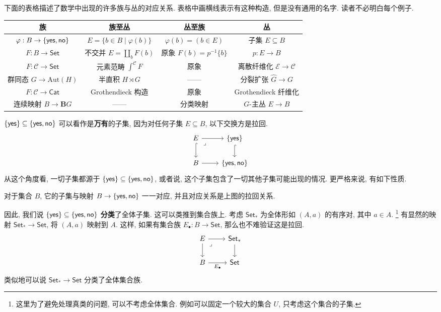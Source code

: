 下面的表格描述了数学中出现的许多族与丛的对应关系.
表格中画横线表示有这种构造, 但是没有通用的名字.
读者不必明白每个例子.

\begin{center}
\begin{tabular}{c c c c}\hline
族 & 族至丛 & 丛至族 & 丛\\\hline
\(\varphi : B \to \{\textnormal{\textsf{yes}}, \textnormal{\textsf{no}}\}\) &
\(E = \{b \in B \mid \varphi(b)\}\) &
\(\varphi(b) = (b \in E)\)&
子集 \(E \subseteq B\) \\
\(F : B \to \mathsf{Set}\) &
\!\!不交并 \(E = \coprod_{b} F(b)\)\!\! &
原象 \(F(b) = p^{-1}\{b\}\) &
\(p : E \to B\)\\
\(F : \mathcal C \to \mathsf{Set}\) &
元素范畴 \(\int^{\mathcal C}F\) &
原象 &
离散纤维化 \(\mathcal E \to \mathcal C\)\\
\!群同态 \(G \to \mathrm{Aut}(H)\)\!&
半直积 \(H \rtimes G\) &
------ &
分裂扩张 \(\hat G \to G\)\\
\(F : \mathcal C \to \mathsf{Cat}\) &
\!Grothendieck 构造\! &
原象 &
\!Grothendieck 纤维化\! \\
连续映射 \(B \to \mathbf{B}G\) &
------ &
分类映射 &
\(G\)-主丛 \(E \to B\)
\\\hline
\end{tabular}
\end{center}

\(\{\textnormal{\textsf{yes}}\} \subseteq \{\textnormal{\textsf{yes}}, \textnormal{\textsf{no}}\}\)
可以看作是\textbf{万有}的子集, 因为对任何子集 \(E \subseteq B\),
以下交换方是拉回.
\[\begin{tikzcd}
  E & {\{\cons{yes}\}} \\
  B & {\{\cons{yes}, \cons{no}\}}
  \arrow[hook, from=1-1, to=2-1]
  \arrow[hook, from=1-2, to=2-2]
  \arrow[from=1-1, to=1-2]
  \arrow[from=2-1, to=2-2]
  \arrow["\lrcorner"{anchor=center, pos=0.125}, draw=none, from=1-1, to=2-2]
\end{tikzcd}\]
从这个角度看, 一切子集都源于
\(\{\textnormal{\textsf{yes}}\} \subseteq \{\textnormal{\textsf{yes}}, \textnormal{\textsf{no}}\}\),
或者说, 这个子集包含了一切其他子集可能出现的情况.
更严格来说, 有如下性质.
\begin{theorem}
对于集合 \(B\), 它的子集与映射 \(B \to \{\textnormal{\textsf{yes}}, \textnormal{\textsf{no}}\}\)
一一对应, 并且对应关系是上图的拉回关系.
\end{theorem}
因此, 我们说 \(\{\textnormal{\textsf{yes}}\} \subseteq \{\textnormal{\textsf{yes}}, \textnormal{\textsf{no}}\}\)
\textbf{分类}了全体子集.
这可以类推到集合族上.
考虑 \(\mathsf{Set}_*\) 为全体形如
\((A, a)\) 的有序对, 其中 \(a \in A\).%
\footnote{这里为了避免处理真类的问题, 可以不考虑全体集合.
例如可以固定一个较大的集合 \(U\), 只考虑这个集合的子集.}
有显然的映射 \(\mathsf{Set}_* \to \mathsf{Set}\),
将 \((A, a)\) 映射到 \(A\).
这样, 如果有集合族 \(E_\bullet : B \to \mathsf{Set}\),
那么也不难验证这是拉回.
\[\begin{tikzcd}
  E & {\mathsf{Set}_*} \\
  B & {\mathsf{Set}}
  \arrow[from=1-1, to=2-1]
  \arrow[from=1-2, to=2-2]
  \arrow[from=1-1, to=1-2]
  \arrow["{E_\bullet}"', from=2-1, to=2-2]
  \arrow["\lrcorner"{anchor=center, pos=0.125}, draw=none, from=1-1, to=2-2]
\end{tikzcd}\]
类似地可以说 \(\mathsf{Set}_* \to \mathsf{Set}\) 分类了全体集合族.

